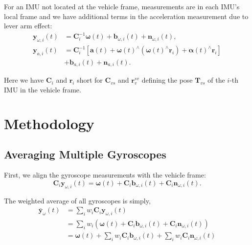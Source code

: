 \documentclass[conference]{IEEEtran}
\begin{document}
For an IMU not located at the vehicle frame, measurements are in each IMU's local frame and we have additional terms in the acceleration measurement due to lever arm effect:
\begin{equation}
\begin{split}
    \textbf{y}_{\omega,i}(t) &= \textbf{C}_{i}^{-1} \bm{\omega}(t) + \textbf{b}_{\omega, i}(t) + \textbf{n}_{\omega,i}(t), \\
    \textbf{y}_{a,i}(t) &= \textbf{C}_i^{-1} \left[ \textbf{a}(t) + \bm{\omega}(t)^\wedge (\bm{\omega}(t)^\wedge \textbf{r}_i) + \bm{\alpha}(t)^\wedge \textbf{r}_i \right] \\
    &+ \textbf{b}_{a,i}(t) + \textbf{n}_{a,i}(t).
\end{split}
\end{equation}

\noindent Here we have $\textbf{C}_i$ and $\textbf{r}_i$ short for $\textbf{C}_{vs}$ and $\textbf{r}_v^{sv}$ defining the pose $\textbf{T}_{vs}$ of the $i$-th IMU in the vehicle frame.

\section{Methodology}\label{methodology}

\subsection{Averaging Multiple Gyroscopes}

First, we align the gyroscope measurements with the vehicle frame:
\begin{equation}
    \textbf{C}_{i} \textbf{y}_{\omega,i}(t) = \bm{\omega}(t) + \textbf{C}_{i} \textbf{b}_{\omega, i}(t) + \textbf{C}_{i} \textbf{n}_{\omega,i}(t).
\end{equation}

\noindent The weighted average of all gyroscopes is simply,
\begin{equation}
\begin{split}
    \bar{\textbf{y}}_\omega(t) &= \sum_i{w_i \textbf{C}_{i} \textbf{y}_{\omega,i}(t)} \\
    &= \sum_i{w_i \left( \bm{\omega}(t) + \textbf{C}_{i} \textbf{b}_{\omega,i}(t) + \textbf{C}_{i} \textbf{n}_{\omega,i}(t) \right)} \\
    &= \bm{\omega}(t) + \sum_i{w_i \textbf{C}_{i} \textbf{b}_{\omega,i}(t)} + \sum_i{w_i \textbf{C}_{i} \textbf{n}_{\omega,i}(t)}
\end{split}
\end{equation}
\end{document}
